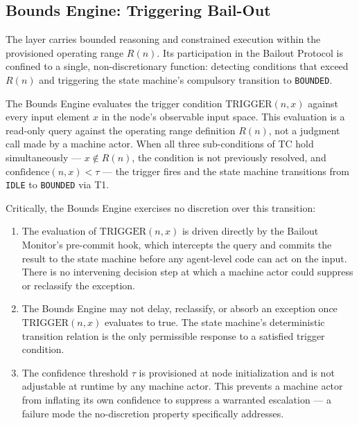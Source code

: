 \subsection{Bounds Engine: Triggering Bail-Out}\label{sec:bounds-trigger}

The \bounds{} layer carries bounded reasoning and constrained execution within the provisioned operating range $R(n)$. Its participation in the Bailout Protocol is confined to a single, non-discretionary function: detecting conditions that exceed $R(n)$ and triggering the state machine's compulsory transition to \texttt{BOUNDED}.

The Bounds Engine evaluates the trigger condition $\text{TRIGGER}(n, x)$ against every input element $x$ in the node's observable input space. This evaluation is a read-only query against the operating range definition $R(n)$, not a judgment call made by a machine actor. When all three sub-conditions of TC hold simultaneously --- $x \notin R(n)$, the condition is not previously resolved, and $\text{confidence}(n, x) < \tau$ --- the trigger fires and the state machine transitions from \texttt{IDLE} to \texttt{BOUNDED} via T1.

Critically, the Bounds Engine exercises no discretion over this transition:

\begin{enumerate}\itemsep=0pt
\item The evaluation of $\text{TRIGGER}(n, x)$ is driven directly by the Bailout Monitor's pre-commit hook, which intercepts the query and commits the result to the state machine before any agent-level code can act on the input. There is no intervening decision step at which a machine actor could suppress or reclassify the exception.

\item The Bounds Engine may not delay, reclassify, or absorb an exception once $\text{TRIGGER}(n, x)$ evaluates to true. The state machine's deterministic transition relation is the only permissible response to a satisfied trigger condition.

\item The confidence threshold $\tau$ is provisioned at node initialization and is not adjustable at runtime by any machine actor. This prevents a machine actor from inflating its own confidence to suppress a warranted escalation --- a failure mode the no-discretion property specifically addresses.
\end{enumerate}


